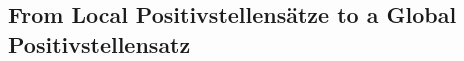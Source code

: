 \documentclass[12pt]{article}
\newcommand{\HSOS}{\widehat{\mathbf{\Sigma}}}
\newcommand{\defeq}{\coloneq}
\newcommand{\mbS}{\mathbb{S}}
\theoremstyle{remark}
\begin{document}




\subsection{From Local Positivstellens\"atze to a Global Positivstellensatz}\label{sec:global_psatz}

\end{document}
